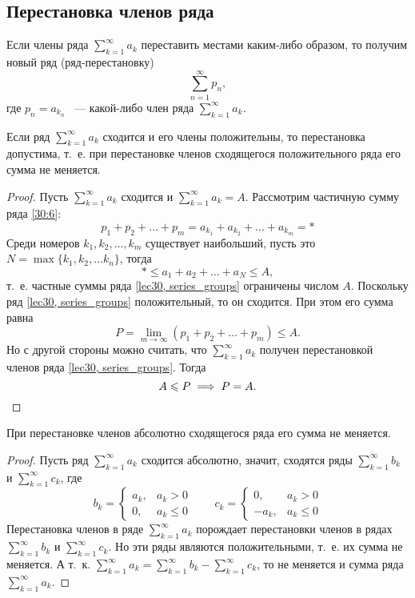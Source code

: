 \documentclass[../../main.tex]{subfiles}
\begin{document}
\subsection{Перестановка членов ряда}
Если члены ряда $\sum\limits_{k = 1}^{\infty} a_k$
переставить местами каким-либо образом, то получим новый ряд (ряд-перестановку)
\begin{equation}
\label{30:6}
\sum\limits_{n = 1}^{\infty} p_n,
\end{equation}
где $p_n = a_{k_n}$ ~--- какой-либо член ряда $\sum\limits_{k = 1}^{\infty} 
a_k$.
\begin{thm}
	Если ряд $\sum\limits_{k = 1}^{\infty} a_k$ сходится и его члены положительны,
	то перестановка допустима, т.~е. при перестановке членов сходящегося
	положительного ряда его сумма не меняется.
\end{thm}
\begin{proof}
	Пусть $\sum\limits_{k = 1}^{\infty} a_k$  сходится и
	$\sum\limits_{k = 1}^{\infty} a_k = A$. Рассмотрим
	частичную сумму ряда \eqref{30:6}:
	\[p_1 + p_2 + \ldots + p_m = a_{k_1} + a_{k_2} + \ldots + a_{k_m} = *\]
	Среди номеров $k_1, k_2, \ldots, k_m$ существует 
	наибольший, пусть это
	$N = \max\{k_1, k_2, \ldots k_n\}$, тогда \[* \leq a_1 + a_2 + \ldots +
	a_N \leq A,\] т.~е. частные суммы ряда \eqref{lec30, series_groups}
	ограничены числом $A$. Поскольку ряд \eqref{lec30, series_groups}
	положительный, то он сходится. При этом его сумма равна
	\[P = \lim\limits_{m \to \infty}(p_1 + p_2 + \ldots + p_m) \leq A.\]
	Но с другой стороны можно считать, что $\sum\limits_{k = 1}^{\infty} a_k$
	получен перестановкой членов ряда \eqref{lec30, series_groups}. Тогда
	\[A \leq P \implies P = A. \qedhere\]
\end{proof}
\begin{crl*}
	При перестановке членов абсолютно сходящегося ряда его сумма не меняется.
\end{crl*}
\begin{proof}
		Пусть ряд $\sum\limits_{k = 1}^{\infty} a_k$ сходится абсолютно,
		значит, сходятся ряды $\sum\limits_{k = 1}^{\infty} b_k$ и
		$\sum\limits_{k = 1}^{\infty} c_k$, где\[b_k = \begin{cases}
			a_k,& a_k > 0\\
			0,& a_k \le 0
		  \end{cases} \qquad
		 c_k = \begin{cases}
			0,& a_k > 0\\
			-a_k,& a_k \le 0
		  \end{cases}\]
  Перестановка членов в ряде $\sum\limits_{k = 1}^{\infty} a_k$ порождает 
  перестановки членов
  в рядах  $\sum\limits_{k = 1}^{\infty} b_k$ и
  $\sum\limits_{k = 1}^{\infty} c_k$. Но эти ряды являются положительными,
  т.~е. их сумма не меняется. А т.~к. $\sum\limits_{k = 1}^{\infty} a_k
   = \sum\limits_{k = 1}^{\infty} b_k - \sum\limits_{k = 1}^{\infty} c_k$,
   то не меняется и сумма ряда $\sum\limits_{k = 1}^{\infty} a_k$.
\end{proof}
\end{document}
